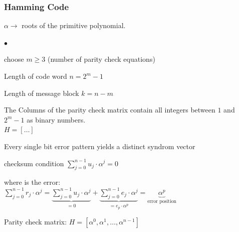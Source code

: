 \subsubsection{Hamming Code}
$\alpha \to$ roots of the primitive polynomial.\\
\begin{list}{$\bullet$}{\setlength{\itemsep}{0cm} \setlength{\parsep}{0cm} \setlength{\topsep}{0.1cm}} 
  \item choose $m \geq 3$ (number of parity check equations)
  \item Length of code word $n=2^m-1$
  \item Length of message block $k=n-m$
  \item The Columns of the parity check matrix contain all integers between $1$ and $2^m-1$ as binary numbers. \\
		$H=[\ldots] $
  \item Every single bit error pattern yields a distinct syndrom vector
  \item checksum condition $\displaystyle\sum_{j=0}^{n-1}u_j \cdot \alpha^j = 0$
  \item where is the error:\\
  		$\displaystyle\sum_{j=0}^{n-1}r_j \cdot \alpha^j = \underbrace{\displaystyle\sum_{j=0}^{n-1}u_j \cdot \alpha^j}_{=0} + \underbrace{\displaystyle\sum_{j=0}^{n-1}e_j \cdot \alpha^j}_{=e_p \cdot \alpha^p}= \underbrace{\alpha^p}_{\text{error position}}$
  \item Parity check matrix: $H=[\alpha^0, \alpha^1, \ldots , \alpha^{n-1}]$

\end{list}


